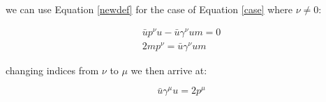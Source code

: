 \documentclass[11pt]{article}
\theoremstyle{definition}
\begin{document}
we can use Equation \ref{newdef} for the case of Equation \ref{case} where $\nu \neq 0$:

\begin{align}
    \bar{u}p^{\nu}u - \bar{u}\gamma^{\nu}um = 0\\
    2mp^{\nu} = \bar{u}\gamma^{\nu}um 
\end{align}

changing indices from $\nu$ to $\mu$ we then arrive at:

\begin{equation}
\boxed{
    \bar{u}\gamma^{\mu}u = 2p^{\mu}
}
\end{equation}




\end{document}
